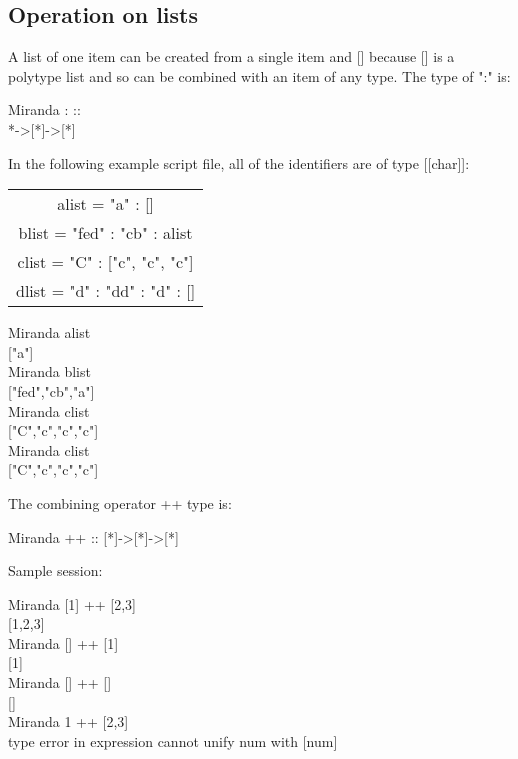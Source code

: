 \documentclass[11pt]{article}
\begin{document}
\subsection{Operation on lists}
A list of one item can be created from a single
item and [] because [] is a polytype list and so can be combined with an item of
any type. The type of ":" is:

\begin{tcolorbox}
Miranda : ::\\
*->[*]->[*]
\end{tcolorbox}

In the following example script file, all of the identifiers are of type [[char]]:

\begin{center}
    
\begin{tabular}{|c|}
\hline
alist = "a" : []\\
blist = "fed" : "cb" : alist\\
clist = "C" : ["c", "c", "c"]\\
dlist = "d" : "dd" : "d" : []\\
\hline
\end{tabular}
\end{center}

\begin{tcolorbox}
Miranda alist\\
{["a"]} \\

Miranda blist\\
{["fed","cb","a"]}\\

Miranda clist\\
{["C","c","c","c"]}\\

Miranda clist\\
{["C","c","c","c"]}
\end{tcolorbox}
The combining operator ++ type is:

\begin{tcolorbox}
Miranda ++ ::
{[*]}->{[*]}->{[*]}
\end{tcolorbox}
Sample session:

\begin{tcolorbox}
Miranda [1] ++ [2,3]\\
{[1,2,3]}\\
Miranda [] ++ [1]\\
{[1]}\\
Miranda [] ++ []\\
{[]}\\
Miranda 1 ++ [2,3]\\
type error in expression
cannot unify num with [num]
\end{tcolorbox}
\end{document}
